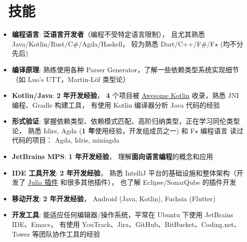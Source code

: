 \documentclass{resume}
\begin{document}
\section{\faCogs\ 技能}
\begin{itemize}[parsep=0.25ex]
  \item \textbf{编程语言}:
    \textbf{泛语言开发者}（编程不受特定语言限制），
    且尤其熟悉 Java/Kotlin/Rust/C\#/Agda/Haskell，
    较为熟悉 Dart/C++/F\#/F$\star$ (均不分先后)

  \item \textbf{编译原理}:
    熟练使用各种 Parser Generator，了解一些依赖类型系统实现细节
    （如 Luo's UTT，Martin-Löf 类型论）

  \item \textbf{Kotlin/Java}:
    \textbf{2 年开发经验}，
    \textbf{4} 个项目被
    \href{https://kotlin.link/?q=ice} {Awesome Kotlin}
    收录，熟悉 JNI 编程、Gradle 构建工具，
    有使用 Kotlin 编译器分析 Java 代码的经验

  \item \textbf{形式验证}:
    掌握依赖类型、依赖模式匹配、高阶归纳类型，正在学习同伦类型论，
    熟悉 Idirs, Agda (\textbf{1 年}使用经验，开发组成员之一)
    和 F$\star$ 编程语言
    \subitem 读过代码的项目： Agda, Idris, miniagda

  \item \textbf{JetBrains MPS}:
    \textbf{1 年开发经验}，
    理解\textbf{面向语言编程}的概念和应用

  \item \textbf{IDE 工具开发}:
    \textbf{2 年开发经验}，
    熟悉 IntelliJ 平台的基础设施和整体架构（开发了
      \href{https://plugins.jetbrains.com/plugin/10413-julia}
           {Julia 插件} 和很多其他插件），
    也了解 Eclipse/SonarQube 的插件开发

  \item \textbf{移动开发}:
    \textbf{2 年开发经验}，
    Android (Java, Kotlin), Fuchsia (Flutter)

  \item \textbf{开发工具}:
    能适应任何编辑器/操作系统，平常在 Ubuntu 下使用 JetBrains IDE、Emacs，
    有使用 YouTrack、Jira、GitHub、BitBucket、Coding.net、Tower 等团队协作工具的经验
\end{itemize}

\end{document}
